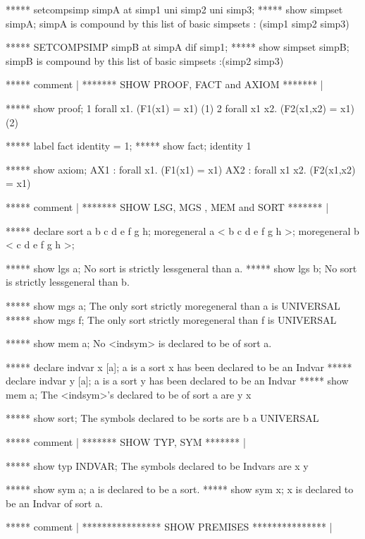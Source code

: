    ***** setcompsimp simpA at simp1 uni simp2 uni simp3;
   ***** show simpset simpA;
   simpA is compound by this list of basic simpsets :
   (simp1 simp2 simp3)
   
   ***** SETCOMPSIMP simpB at simpA dif simp1;
   ***** show simpset simpB;
   simpB is compound by this list of basic simpsets :(simp2 simp3)
   
   
   ***** comment | ******* SHOW PROOF, FACT and AXIOM ******* |
   
   ***** show proof;
   1   forall x1. (F1(x1) = x1)     (1)
   2   forall x1 x2. (F2(x1,x2) = x1)     (2)
   
   ***** label fact identity = 1;
   ***** show fact;
   identity   1
   
   ***** show axiom;
   AX1 : forall x1. (F1(x1) = x1)
   AX2 : forall x1 x2. (F2(x1,x2) = x1)
   
   ***** comment | ******* SHOW LSG, MGS , MEM and SORT ******* |
   
   ***** declare sort a b c d e f g h;
   moregeneral a < b c d e f g h >;
   moregeneral b < c d e f g h >;
   
   ***** show lgs a;
   No sort is strictly lessgeneral than a.
   ***** show lgs b;
   No sort is strictly lessgeneral than b.
   
   ***** show mgs a;
   The only sort strictly moregeneral than a is UNIVERSAL
   ***** show mgs f;
   The only sort strictly moregeneral than f is UNIVERSAL
   
   ***** show mem a;
   No <indsym> is declared to be of sort a.
   
   ***** declare indvar x [a];
   a is a sort
   x has been declared to be an Indvar
   ***** declare indvar y [a];
   a is a sort
   y has been declared to be an Indvar
   ***** show mem a;
   The <indsym>'s declared to be of sort a are
       y  x  
   
   ***** show sort;
   The symbols declared to be sorts are
       b  a  UNIVERSAL  
   
   ***** comment | ******* SHOW TYP, SYM ******* |
   
   ***** show typ INDVAR;
   The symbols declared to be Indvars are
       x  y  
   
   ***** show sym a;
   a is declared to be a sort.
   ***** show sym x;
   x is declared to be an Indvar of sort a.
   
   
   ***** comment | **************** SHOW PREMISES *************** |
   
